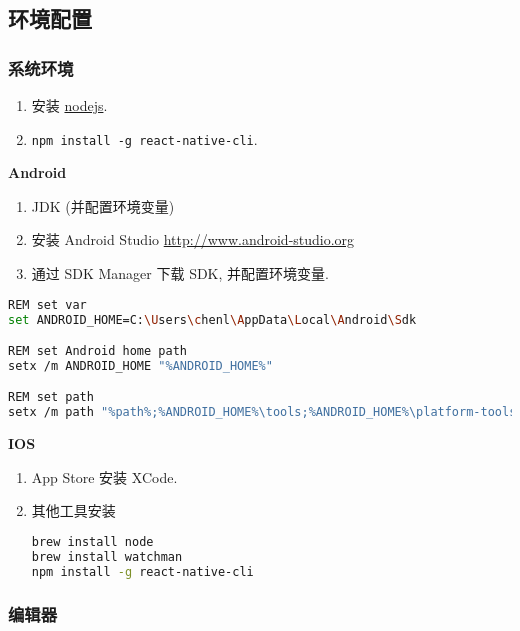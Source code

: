 \subsection{环境配置}\label{ux73afux5883ux914dux7f6e}

\subsubsection{系统环境}\label{ux7cfbux7edfux73afux5883}

\begin{enumerate}
\def\labelenumi{\arabic{enumi}.}
\tightlist
\item
  安装 \href{https://nodejs.org}{nodejs}.
\item
  \lstinline!npm install -g react-native-cli!.
\end{enumerate}

\textbf{Android}

\begin{enumerate}
\def\labelenumi{\arabic{enumi}.}
\tightlist
\item
  JDK (并配置环境变量)
\item
  安装 Android Studio \url{http://www.android-studio.org}
\item
  通过 SDK Manager 下载 SDK, 并配置环境变量.
\end{enumerate}

\begin{lstlisting}[language=bash]
REM set var
set ANDROID_HOME=C:\Users\chenl\AppData\Local\Android\Sdk

REM set Android home path
setx /m ANDROID_HOME "%ANDROID_HOME%"

REM set path
setx /m path "%path%;%ANDROID_HOME%\tools;%ANDROID_HOME%\platform-tools;"
\end{lstlisting}

\textbf{IOS}

\begin{enumerate}
\def\labelenumi{\arabic{enumi}.}
\item
  App Store 安装 XCode.
\item
  其他工具安装

\begin{lstlisting}[language=bash]
brew install node
brew install watchman
npm install -g react-native-cli
\end{lstlisting}
\end{enumerate}

\subsubsection{编辑器}\label{ux7f16ux8f91ux5668}

